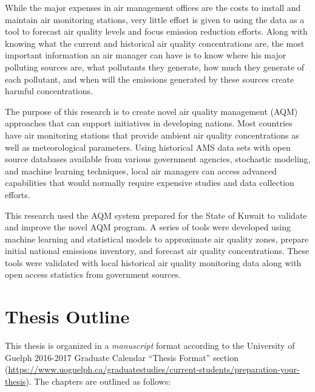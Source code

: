 While the major expenses in air management offices are the costs to install and maintain air monitoring stations, very little effort is given to using the data as a tool to forecast air quality levels and focus emission reduction efforts. Along with knowing what the current and historical air quality concentrations are, the most important information an air manager can have is to know where his major polluting sources are, what pollutants they generate, how much they generate of each pollutant, and when will the emissions generated by these sources create harmful concentrations.

The purpose of this research is to create novel air quality management (AQM) approaches that can support initiatives in developing nations. Most countries have air monitoring stations that provide ambient air quality concentrations as well as meteorological parameters. Using historical AMS data sets with open source databases available from various government agencies, stochastic modeling, and machine learning techniques, local air managers can access advanced capabilities that would normally require expensive studies and data collection efforts.

This research used the AQM system prepared for the State of Kuwait to validate and improve the novel AQM program. A series of tools were developed using machine learning and statistical models to approximate air quality zones, prepare initial national emissions inventory, and forecast air quality concentrations.  These tools were validated with local historical air quality monitoring data along with open access statistics from government sources.

\section{Thesis Outline}
This thesis is organized in a \textit{manuscript} format according to the University of Guelph 2016-2017 Graduate Calendar ``Thesis Format'' section (\url{https://www.uoguelph.ca/graduatestudies/current-students/preparation-your-thesis}).  The chapters are outlined as follows:

